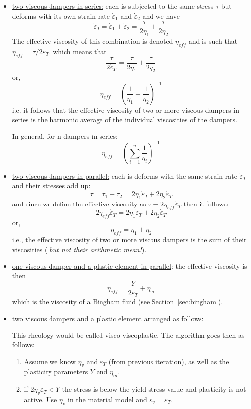 \begin{itemize}
\item \underline{two viscous dampers in series:} each is subjected to the same stress $\tau$ but deforms 
with its own strain rate $\dot{\varepsilon}_1$ and $\dot{\varepsilon}_2$ and we have 
\begin{equation}
\dot{\varepsilon}_T 
= \dot{\varepsilon}_1 + \dot{\varepsilon}_2
= \frac{\tau}{2\eta_1} + \frac{\tau}{2\eta_2}
\end{equation}
The effective viscosity of this combination is denoted $\eta_{eff}$ and is such that 
$\eta_{eff}=\tau/2\dot{\varepsilon}_T$, which means that 
\[
\frac{\tau}{2\dot{\varepsilon}_T} = \frac{\tau}{2\eta_1} + \frac{\tau}{2\eta_2}
\]
or, 
\[
\eta_{eff}= \left( \frac{1}{\eta_1} + \frac{1}{\eta_2} \right)^{-1}
\]
i.e. it follows that the effective viscosity of two or more viscous dampers in series is the harmonic 
average of the individual viscosities of the dampers.

In general, for n dampers in series:
\[
\eta_{eff}= \left( \sum_{i=1}^n \frac{1}{\eta_i} \right)^{-1}
\]




\item \underline{two viscous dampers in parallel:} 
each is deforms with the same strain rate $\dot{\varepsilon}_T$
and their stresses add up:
\[
\tau = \tau_1 + \tau_2 = 2 \eta_1 \dot{\varepsilon}_T  + 2 \eta_2 \dot{\varepsilon}_T
\]
and since we define the effective viscosity as $\tau = 2 \eta_{eff} \dot{\varepsilon}_T$ then it follows:
\[
2 \eta_{eff} \dot{\varepsilon}_T = 2 \eta_1 \dot{\varepsilon}_T  + 2 \eta_2 \dot{\varepsilon}_T
\]
or, 
\[
\eta_{eff} = \eta_1 + \eta_2 
\]
i.e., the effective viscosity of two or more viscous dampers is the sum of their viscosities ({\sl 
but not their arithmetic mean!}).


\item \underline{one viscous damper and a plastic element in parallel}:
the effective viscosity is then  
\[
\eta_{eff} = \frac{Y}{2 \dot{\varepsilon}_T}+\eta_m
\]
which is the viscosity of a Bingham fluid (see Section~\ref{sec:bingham}).



\item \underline{two viscous dampers and a plastic element} arranged as follows:
\begin{center}

\end{center}
This rheology would be called visco-viscoplastic.
The algorithm goes then as follows:
\begin{enumerate}
\item Assume we know $\eta_v$ and $\dot\varepsilon_T$ (from previous iteration), as well as the plasticity parameters $Y$ and $\eta_m$.
\item if $2 \eta_v \dot\varepsilon_T < Y$ the stress is below the yield stress value and plasticity is not active. Use $\eta_v$ in the material model and $\dot\varepsilon_v=\dot\varepsilon_T$.


\end{enumerate}
\end{itemize}
